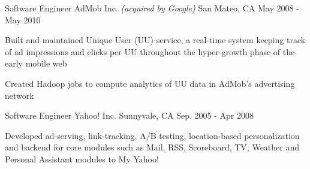 \begin{cventries}
  \cventry
    {Software Engineer} %
    {AdMob Inc. \bodyfontlight\emph{(acquired by Google)}} %
    {San Mateo, CA} %
    {May 2008 - May 2010} %
    {
      \begin{cvitems} %
        \item{Built and maintained Unique User (UU) service, a real-time system keeping track of ad impressions and clicks per UU throughout the hyper-growth phase of the early mobile web}
        \item{Created Hadoop jobs to compute analytics of UU data in AdMob's advertising network}
      \end{cvitems}
    }

  \cventry
    {Software Engineer} %
    {Yahoo! Inc.} %
    {Sunnyvale, CA} %
    {Sep. 2005 - Apr 2008} %
    {
      \begin{cvitems} %
        \item{Developed ad-serving, link-tracking, A/B testing, location-based personalization and backend for core modules such as Mail, RSS, Scoreboard, TV, Weather and Personal Assistant modules to My Yahoo!}
      \end{cvitems}
    }

\end{cventries}
